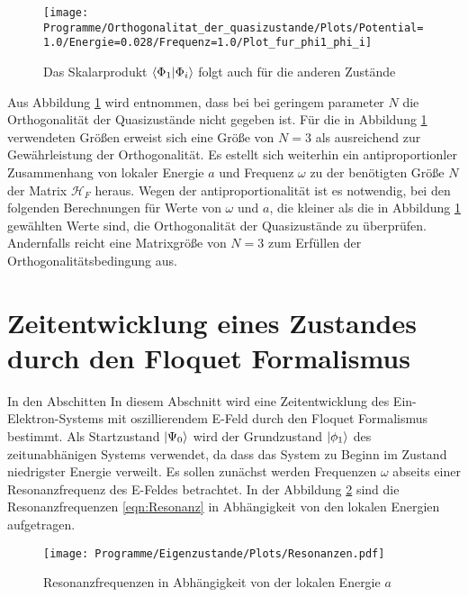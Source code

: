 \begin{figure}
    \centering     %
    \texttt{[image: Programme/Orthogonalitat\_der\_quasizustande/Plots/Potential=1.0/Energie=0.028/Frequenz=1.0/Plot\_fur\_phi1\_phi\_i]}
    \caption{Das Skalarprodukt $\braket{\Phi_1|\Phi_i}$ folgt auch für die anderen Zustände}
     \label{fig:ortho}
\end{figure}

Aus Abbildung \ref{fig:ortho} wird entnommen, dass bei bei geringem parameter $N$ die Orthogonalität der Quasizustände
nicht gegeben ist.
Für die in Abbildung \ref{fig:ortho} verwendeten Größen
erweist sich eine Größe von $N=3$ als ausreichend zur Gewährleistung der Orthogonalität.
Es estellt sich weiterhin ein antiproportionler Zusammenhang von lokaler Energie $a$ und Frequenz $\omega$ zu der
benötigten Größe $N$ der Matrix $\mathcal{H}_F$
heraus.
Wegen der antiproportionalität ist es notwendig,
bei den folgenden Berechnungen für
Werte von $\omega$ und $a$, die kleiner als die in Abbildung
\ref{fig:ortho} gewählten Werte sind, die
Orthogonalität der Quasizustände zu überprüfen.
Andernfalls reicht eine Matrixgröße von $N=3$ zum Erfüllen der Orthogonalitätsbedingung aus.




\section{Zeitentwicklung eines Zustandes durch den Floquet Formalismus}
In den Abschitten
In diesem Abschnitt wird eine Zeitentwicklung des Ein-Elektron-Systems mit oszillierendem E-Feld durch den Floquet Formalismus bestimmt.
Als Startzustand $\ket{\Psi_0}$ wird der Grundzustand $\ket{\phi_1}$ des zeitunabhänigen Systems verwendet, da
dass das System zu Beginn im Zustand niedrigster Energie verweilt.
Es sollen zunächst werden Frequenzen $\omega$ abseits einer Resonanzfrequenz des E-Feldes
betrachtet.
In der Abbildung \ref{fig:Resonanz} sind
 die Resonanzfrequenzen \eqref{eqn:Resonanz} in Abhängigkeit
von den lokalen Energien aufgetragen.

\begin{figure}
  \centering
  \texttt{[image: Programme/Eigenzustande/Plots/Resonanzen.pdf]}
  \caption{Resonanzfrequenzen in Abhängigkeit von der lokalen Energie $a$}
  \label{fig:Resonanz}
\end{figure}


